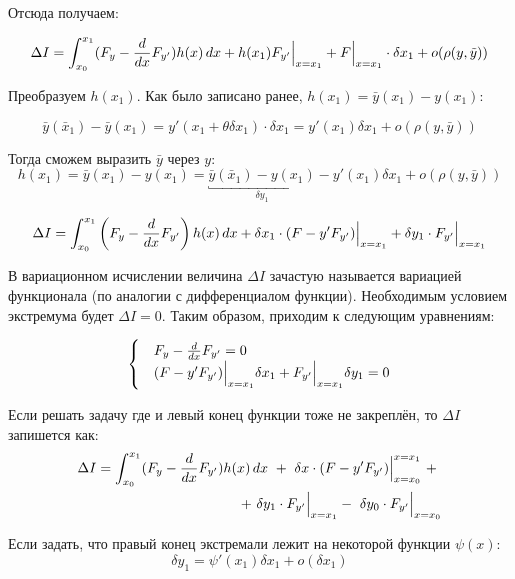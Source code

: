 \documentclass[12pt]{article}
\begin{document}
			Отсюда получаем:

			$$\Delta I = \int_{x_0}^{x_1} (F_y - \frac{d}{dx} F_{y'})h(x)\,dx + h(x_1)F_{y'}\Big|_{x=x_1}^{} + 
	  		F\Big|_{x=x_1}^{}\cdot \delta x_1 + o(\rho(y,\tilde{y}))$$

			Преобразуем $h(x_1)$. Как было записано ранее, $h(x_1) = \bar{y}(x_1) - y(x_1)$:

			$$\bar{y}(\bar{x}_1) - \bar{y}(x_1) = y'(x_1 + \theta \delta x_1)\cdot \delta x_1 
			= y'(x_1) \delta x_1 + o(\rho(y, \bar{y}))$$

			Тогда сможем выразить $\bar{y}$ через $y$:
			$$h(x_1) = \bar{y}(x_1) - y(x_1) = \underbracket{\bar{y}(\bar{x}_1) - y(x_1)}_{\delta y_1}
	  		- y'(x_1)\delta x_1 + o(\rho(y, \bar{y}))$$

			\begin{align*}
				\Delta I = \int_{x_0}^{x_1} \left(F_y - \frac{d}{dx}F_{y'}\right)h(x)\,dx
				+ \delta x_1\cdot(F - y'F_{y'}) \Big|_{x=x_1}^{}
				+ \delta y_1 \cdot F_{y'}\Big|_{x=x_1}^{}
			\end{align*}

			В вариационном исчислении величина $\Delta I$ зачастую называется вариацией функционала (по
			аналогии с дифференциалом функции). Необходимым условием экстремума будет $\Delta I = 0$. Таким
			образом, приходим к следующим уравнениям:

			\begin{equation}
				\label{eq:preTraversal}
				\begin{cases}
				&F_y - \frac{d}{dx} F_{y'} = 0 \\
				&(F - y'F_{y'})\Big|_{x = x_1}^{} \delta x_1 + F_{y'} \Big|_{x=x_1}^{}\delta y_1 = 0
				\end{cases} 
			\end{equation}

			 Если решать задачу где и левый конец функции тоже не закреплён, то
			$\Delta I$ запишется как:
			\begin{align*}
				\Delta I = \int_{x_0}^{x_1} (F_y - \frac{d}{dx}F_{y'})h(x)\,dx~+~ 
				\delta x\cdot(F - y'F_{y'})\Big|_{x = x_0}^{x = x_1}~+~ \\
				~+~\delta y_1 \cdot F_{y'} \Big|_{x=x_1}^{}-~\delta y_0 \cdot F_{y'} \Big|_{x=x_0}^{}
			\end{align*}


			Если задать, что правый конец экстремали лежит на некоторой функции $\psi(x)$:
			$$\delta y_1 = \psi'(x_1) \delta x_1 + o(\delta x_1)$$
\end{document}
